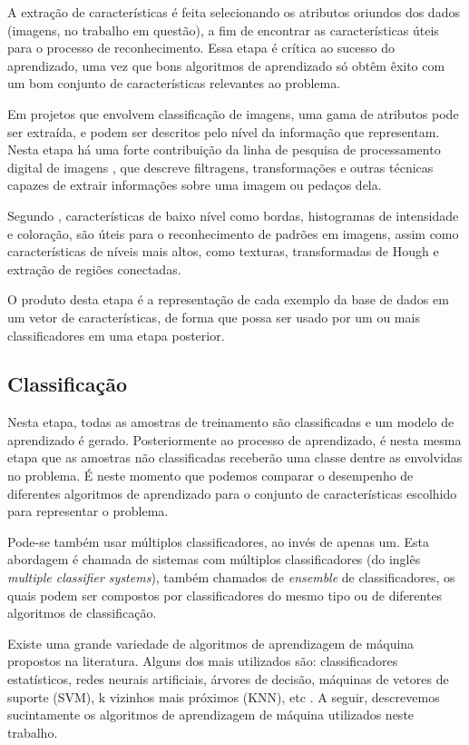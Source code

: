 A extração de características é feita selecionando os atributos oriundos dos dados (imagens, no trabalho em questão), a fim de encontrar as características úteis para o processo de reconhecimento. Essa etapa é crítica ao sucesso do aprendizado, uma vez que bons algoritmos de aprendizado só obtêm êxito com um bom conjunto de características relevantes ao problema.

Em projetos que envolvem classificação de imagens, uma gama de atributos pode ser extraída, e podem ser descritos pelo nível da informação que representam. Nesta etapa há uma forte contribuição da linha de pesquisa de processamento digital de imagens \cite{gonzalez:2002}, que descreve filtragens, transformações e outras técnicas capazes de extrair informações sobre uma imagem ou pedaços dela.

Segundo , características de baixo nível como bordas, histogramas de intensidade e coloração, são úteis para o reconhecimento de padrões em imagens, assim como características de níveis mais altos, como texturas, transformadas de Hough e extração de regiões conectadas.

O produto desta etapa é a representação de cada exemplo da base de dados em um vetor de características, de forma que possa ser usado por um ou mais classificadores em uma etapa posterior.


\subsection{Classificação}\label{sec:classificacao}

Nesta etapa, todas as amostras de treinamento são classificadas e um modelo de aprendizado é gerado. Posteriormente ao processo de aprendizado, é nesta mesma etapa que as amostras não classificadas receberão uma classe dentre as envolvidas no problema. É neste momento que podemos comparar o desempenho de diferentes algoritmos de aprendizado para o conjunto de características escolhido para representar o problema.

Pode-se também usar múltiplos classificadores, ao invés de apenas um. Esta abordagem é chamada de sistemas com múltiplos classificadores (do inglês \textit{multiple classifier systems}), também chamados de \textit{ensemble} de classificadores, os quais podem ser compostos por classificadores do mesmo tipo ou de diferentes algoritmos de classificação. 

Existe uma grande variedade de algoritmos de aprendizagem de máquina propostos na literatura. Alguns dos mais utilizados são: classificadores estatísticos, redes neurais artificiais, árvores de decisão, máquinas de vetores de suporte (SVM), k vizinhos mais próximos (KNN), etc \cite{jain:1989}. A seguir, descrevemos sucintamente os algoritmos de aprendizagem de máquina utilizados neste trabalho.

